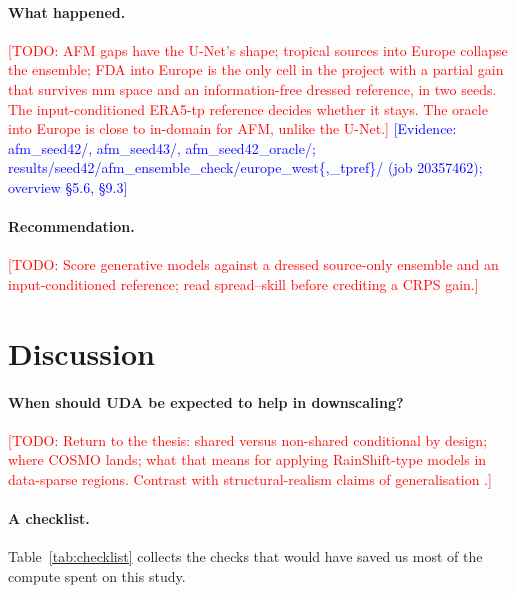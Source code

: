 \documentclass{ametsocV6.2}
\newcommand{\todo}[1]{\textcolor{red}{[TODO: #1]}}
\newcommand{\ev}[1]{\textcolor{blue}{[Evidence: #1]}}
\begin{document}
\paragraph{What happened.} \todo{AFM gaps have the U-Net's shape; tropical
sources into Europe collapse the ensemble; FDA into Europe is the only
cell in the project with a partial gain that survives mm space and an
information-free dressed reference, in two seeds. The input-conditioned
ERA5-tp reference decides whether it stays. The oracle into Europe is
close to in-domain for AFM, unlike the U-Net.}
\ev{afm\_seed42/, afm\_seed43/, afm\_seed42\_oracle/;
results/seed42/afm\_ensemble\_check/europe\_west\{,\_tpref\}/ (job 20357462);
overview \S5.6, \S9.3}

\paragraph{Recommendation.} \todo{Score generative models against a
dressed source-only ensemble and an input-conditioned reference; read
spread--skill before crediting a CRPS gain.}

\section{Discussion}\label{sec:discussion}

\paragraph{When should UDA be expected to help in downscaling?}
\todo{Return to the thesis: shared versus non-shared conditional by
design; where COSMO lands; what that means for applying RainShift-type
models in data-sparse regions. Contrast with structural-realism claims of
generalisation \citep{glawion2025}.}

\paragraph{A checklist.} Table~\ref{tab:checklist} collects the checks
that would have saved us most of the compute spent on this study.
\end{document}
